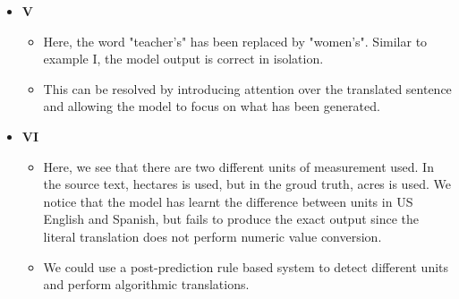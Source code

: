 \documentclass[a4paper]{article}
\begin{document}
\begin{itemize}
\begin{itemize}
    \end{itemize}
    \item \textbf{V} 
    \begin{itemize}
        \item Here, the word "teacher's" has been replaced by "women's". Similar to example I, the model output is correct in isolation. 
        \item This can be resolved by introducing attention over the translated sentence and allowing the model to focus on what has been generated.
    \end{itemize}
    \item \textbf{VI}  
    \begin{itemize}
        \item Here, we see that there are two different units of measurement used. In the source text, hectares is used, but in the groud truth, acres is used. We notice that the model has learnt the difference between units in US English and Spanish, but fails to produce the exact output since the literal translation does not perform numeric value conversion.
        \item We could use a post-prediction rule based system to detect different units and perform algorithmic translations.
    \end{itemize}
\end{itemize}
\end{document}
